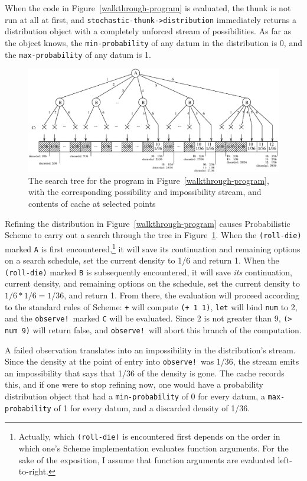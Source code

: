 \documentclass[10pt]{sigplanconf}
\newcommand{\code}[1]{\texttt{#1}}
\begin{document}
When the code in Figure~\ref{walkthrough-program} is evaluated, the
thunk is not run at all at first, and
\code{stochastic-thunk->distribution} immediately returns a
distribution object with a completely unforced stream of
possibilities.  As far as the object knows, the \code{min-probability}
of any datum in the distribution is 0, and the \code{max-probability} of
any datum is 1.

\begin{figure}[htbp]
\includegraphics[width=500pt]{walkthrough.eps}
\caption{The search tree for the program in Figure~\ref{walkthrough-program}, with the corresponding possibility and impossibility stream, and contents of cache at selected points}
\label{walkthrough}
\end{figure}

Refining the distribution in Figure~\ref{walkthrough-program} causes
Probabilistic Scheme to carry out a search through the tree in
Figure~\ref{walkthrough}.  When the \code{(roll-die)} marked \code{A}
is first encountered,\footnote{Actually, which \code{(roll-die)} is
encountered first depends on the order in which one's Scheme
implementation evaluates function arguments.  For the sake of the
exposition, I assume that function arguments are evaluated
left-to-right.} it will save its continuation and remaining options on
a search schedule, set the current density to 1/6 and return 1.  When
the \code{(roll-die)} marked \code{B} is subsequently encountered, it
will save \emph{its} continuation, current density, and remaining
options on the schedule, set the current density to $1/6 * 1/6 =
1/36$, and return 1.  From there, the evaluation will proceed
according to the standard rules of Scheme: \code{+} will compute
\code{(+ 1 1)}, \code{let} will bind \code{num} to 2, and the
\code{observe!}\ marked \code{C} will be evaluated.  Since 2 is not
greater than 9, \code{(> num 9)} will return false, and
\code{observe!}\ will abort this branch of the computation.

A failed observation translates into an impossibility in the
distribution's stream.  Since the density at the point of entry into
\code{observe!}\ was 1/36, the stream emits an impossibility that says
that 1/36 of the density is gone.  The cache records this, and if one
were to stop refining now, one would have a probability distribution
object that had a \code{min-probability} of 0 for every datum, a
\code{max-probability} of 1 for every datum, and a discarded density
of 1/36.
\end{document}
